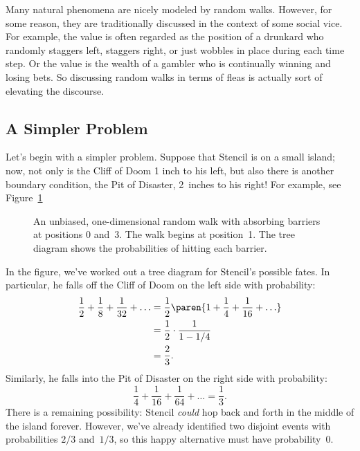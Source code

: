 Many natural phenomena are nicely modeled by random walks.  However,
for some reason, they are traditionally discussed in the context of
some social vice.  For example, the value is often regarded as the
position of a drunkard who randomly staggers left, staggers right, or
just wobbles in place during each time step.  Or the value is the
wealth of a gambler who is continually winning and losing bets.  So
discussing random walks in terms of fleas is actually sort of
elevating the discourse.

\subsection{A Simpler Problem}

Let's begin with a simpler problem.  Suppose that Stencil is on a
small island; now, not only is the Cliff of Doom 1 inch to his left,
but also there is another boundary condition, the Pit of Disaster,
2~inches to his right!  For example, see Figure~\ref{fig:19P1}

\begin{figure}


\caption{An unbiased, one-dimensional random walk with absorbing
  barriers at positions 0 and~3.  The walk begins at position~1.  The
  tree diagram shows the probabilities of hitting each barrier.}

\label{fig:19P1}

\end{figure}

In the figure, we've worked out a tree diagram for Stencil's possible
fates.  In particular, he falls off the Cliff of Doom on the left side
with probability:
%
\begin{align*}
\frac{1}{2} + \frac{1}{8} + \frac{1}{32} + \ldots
    & = \frac{1}{2} \paren{1 + \frac{1}{4} + \frac{1}{16} + \ldots} \\
    & = \frac{1}{2} \cdot \frac{1}{1 - 1/4} \\
    & = \frac{2}{3}.
\end{align*}
%
Similarly, he falls into the Pit of Disaster on the right side with
probability:
%
\[
\frac{1}{4} + \frac{1}{16} + \frac{1}{64} + \ldots = \frac{1}{3}.
\]
%
There is a remaining possibility: Stencil \emph{could} hop back and
forth in the middle of the island forever.  However, we've already
identified two disjoint events with probabilities $2/3$ and~$1/3$, so
this happy alternative must have probability~0.

